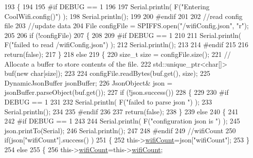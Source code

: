\begin{DoxyCode}
193 \{
194 
195 \textcolor{preprocessor}{#if DEBUG == 1 }
196 
197     Serial.println( F(\textcolor{stringliteral}{"Entering CoolWifi.config()"}) );
198     Serial.println();
199 
200 \textcolor{preprocessor}{#endif}
201 
202     \textcolor{comment}{//read config file}
203     \textcolor{comment}{//update data}
204     File configFile = SPIFFS.open(\textcolor{stringliteral}{"/wifiConfig.json"}, \textcolor{stringliteral}{"r"});
205 
206     \textcolor{keywordflow}{if} (!configFile) 
207     \{
208     
209 \textcolor{preprocessor}{    #if DEBUG == 1 }
210 
211         Serial.println( F(\textcolor{stringliteral}{"failed to read /wifiConfig.json"}) );
212         Serial.println();
213 
214 \textcolor{preprocessor}{    #endif}
215 
216         \textcolor{keywordflow}{return}(\textcolor{keyword}{false});
217     \}
218     \textcolor{keywordflow}{else}
219     \{
220         \textcolor{keywordtype}{size\_t} size = configFile.size();
221         \textcolor{comment}{// Allocate a buffer to store contents of the file.}
222         std::unique\_ptr<char[]> buf(\textcolor{keyword}{new} \textcolor{keywordtype}{char}[size]);
223 
224         configFile.readBytes(buf.get(), size);
225         DynamicJsonBuffer jsonBuffer;
226         JsonObject& json = jsonBuffer.parseObject(buf.get());
227         \textcolor{keywordflow}{if} (!json.success()) 
228         \{
229         
230 \textcolor{preprocessor}{        #if DEBUG == 1 }
231 
232             Serial.println( F(\textcolor{stringliteral}{"failed to parse json "}) );
233             Serial.println();
234         
235 \textcolor{preprocessor}{        #endif}
236             
237             \textcolor{keywordflow}{return}(\textcolor{keyword}{false});
238         \} 
239         \textcolor{keywordflow}{else}
240         \{
241         
242 \textcolor{preprocessor}{        #if DEBUG == 1 }
243         
244             Serial.println( F(\textcolor{stringliteral}{"configuration json is "}) );
245             json.printTo(Serial);
246             Serial.println();
247 
248 \textcolor{preprocessor}{        #endif}
249             \textcolor{comment}{//wifiCount}
250             \textcolor{keywordflow}{if}(json[\textcolor{stringliteral}{"wifiCount"}].success() )
251             \{           
252                 this->\hyperlink{classCoolWifi_ab133bd92fcb895b884deecd6678592e4}{wifiCount}=json[\textcolor{stringliteral}{"wifiCount"}];
253             \}
254             \textcolor{keywordflow}{else}
255             \{
256                 this->\hyperlink{classCoolWifi_ab133bd92fcb895b884deecd6678592e4}{wifiCount}=this->\hyperlink{classCoolWifi_ab133bd92fcb895b884deecd6678592e4}{wifiCount};

\end{DoxyCode}
